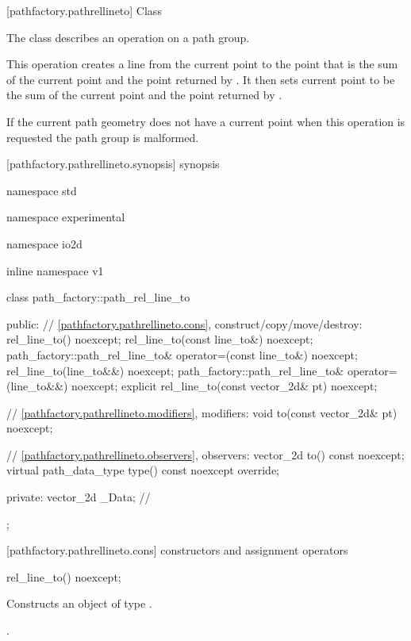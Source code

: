  [pathfactory.pathrellineto] {Class }

\pnum
{}
The class  describes an operation on a path group.

\pnum
This operation creates a line from the current point to the point that is the sum of the current point and the point returned by . It then sets current point to be the sum of the current point and the point returned by .

\pnum
If the current path geometry does not have a current point when this operation is requested the path group is malformed.

 [pathfactory.pathrellineto.synopsis] { synopsis}

\begin{codeblock}
namespace std { namespace experimental { namespace io2d { inline namespace v1 {
  class path_factory::path_rel_line_to {
  public:
    // \ref{pathfactory.pathrellineto.cons}, construct/copy/move/destroy:
    rel_line_to() noexcept;
    rel_line_to(const line_to&) noexcept;
    path_factory::path_rel_line_to& operator=(const line_to&) noexcept;
    rel_line_to(line_to&&) noexcept;
    path_factory::path_rel_line_to& operator=(line_to&&) noexcept;
    explicit rel_line_to(const vector_2d& pt) noexcept;

    // \ref{pathfactory.pathrellineto.modifiers}, modifiers:
    void to(const vector_2d& pt) noexcept;

    // \ref{pathfactory.pathrellineto.observers}, observers:
    vector_2d to() const noexcept;
    virtual path_data_type type() const noexcept override;
    
  private:
    vector_2d _Data; // \expos
  };
} } } }
\end{codeblock}

 [pathfactory.pathrellineto.cons] { constructors and assignment operators}

\begin{itemdecl}
    rel_line_to() noexcept;
\end{itemdecl}
\begin{itemdescr}
	\pnum
	\effects
	Constructs an object of type .
	
	\pnum
	\postconditions
	.
\end{itemdescr}

